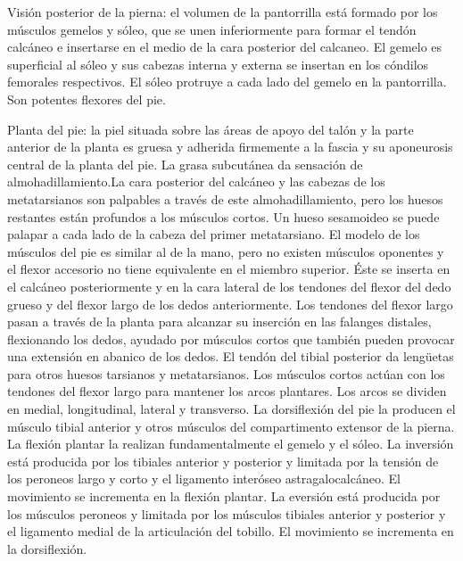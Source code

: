 \documentclass[a4paper,12pt]{article} %
\begin{document}
Visión posterior de la pierna: el volumen de la pantorrilla está formado por los músculos gemelos y sóleo, que se unen inferiormente para formar el tendón calcáneo e insertarse en el medio de la cara posterior del calcaneo. El gemelo es superficial al sóleo y sus cabezas interna y externa se insertan en los cóndilos femorales respectivos. El sóleo protruye a cada lado del gemelo en la pantorrilla. Son potentes flexores del pie.

Planta del pie: la piel situada sobre las áreas de apoyo del talón y la parte anterior de la planta es gruesa y adherida firmemente a la fascia y su aponeurosis central de la planta del pie. La grasa subcutánea da sensación de almohadillamiento.La cara posterior del calcáneo y las cabezas de los metatarsianos son palpables a través de este almohadillamiento, pero los huesos restantes están profundos a los músculos cortos. Un hueso sesamoideo se puede palapar a cada lado de la cabeza del primer metatarsiano. El modelo de los músculos del pie es similar al de la mano, pero no existen músculos oponentes y el flexor accesorio no tiene equivalente en el miembro superior. Éste se inserta en el calcáneo posteriormente y en la cara lateral de los tendones del flexor del dedo grueso y del flexor largo de los dedos anteriormente. Los tendones del flexor largo pasan a través de la planta para alcanzar su inserción en las falanges distales, flexionando los dedos, ayudado por músculos cortos que también pueden provocar una extensión en abanico de los dedos. El tendón del tibial posterior da lengüetas para otros huesos tarsianos y metatarsianos. Los músculos cortos actúan con los tendones del flexor largo para mantener los arcos plantares. Los arcos se dividen en medial, longitudinal, lateral y transverso.
La dorsiflexión del pie la producen el músculo tibial anterior y otros músculos del compartimento extensor de la pierna. La flexión plantar la realizan fundamentalmente el gemelo y el sóleo. La inversión está producida por los tibiales anterior y posterior y limitada por la tensión de los peroneos largo y corto y el ligamento interóseo astragalocalcáneo. El movimiento se incrementa en la flexión plantar. La eversión está producida por los músculos peroneos y limitada por los músculos tibiales anterior y posterior y el ligamento medial de la articulación del tobillo. El movimiento se incrementa en la dorsiflexión.
\end{document}
